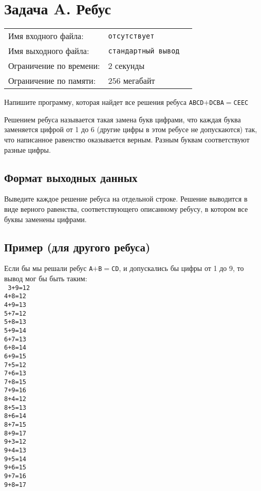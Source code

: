 \documentclass[12pt]{scrartcl}
\newcommand{\inputFile}{отсутствует}
\newcommand{\outputFile}{стандартный вывод}
\begin{document}
\singlespacing

\section*{Задача A. Ребус}

\begin{tabularx}{\textwidth}{l l X}
    Имя входного файла: & \texttt{\inputFile} \\
    Имя выходного файла: & \texttt{\outputFile} \\
    Ограничение по времени: & $2$ секунды \\
    Ограничение по памяти: & $256$ мегабайт \\
\end{tabularx}

Напишите программу, которая найдет все решения ребуса \texttt{ABCD}$+$\texttt{DCBA}$=$\texttt{CEEC}

Решением ребуса называется такая замена букв цифрами, что каждая буква заменяется цифрой от 1 до 6
(другие цифры в этом ребусе не допускаются) так, что написанное равенство оказывается верным.
Разным буквам соответствуют разные цифры.


\subsection*{Формат выходных данных}
Выведите каждое решение ребуса на отдельной строке.
Решение выводится в виде верного равенства, соответствующего описанному ребусу,
в котором все буквы заменены цифрами.

\subsection*{Пример (для другого ребуса)}

Если бы мы решали ребус \texttt{A}$+$\texttt{B}$=$\texttt{CD},
и допускались бы цифры от 1 до 9, то вывод мог бы быть таким: \\
\texttt{
3+9=12 \\
4+8=12 \\
4+9=13 \\
5+7=12 \\
5+8=13 \\
5+9=14 \\
6+7=13 \\
6+8=14 \\
6+9=15 \\
7+5=12 \\
7+6=13 \\
7+8=15 \\
7+9=16 \\
8+4=12 \\
8+5=13 \\
8+6=14 \\
8+7=15 \\
8+9=17 \\
9+3=12 \\
9+4=13 \\
9+5=14 \\
9+6=15 \\
9+7=16 \\
9+8=17 \\
}
\newpage
\end{document}
